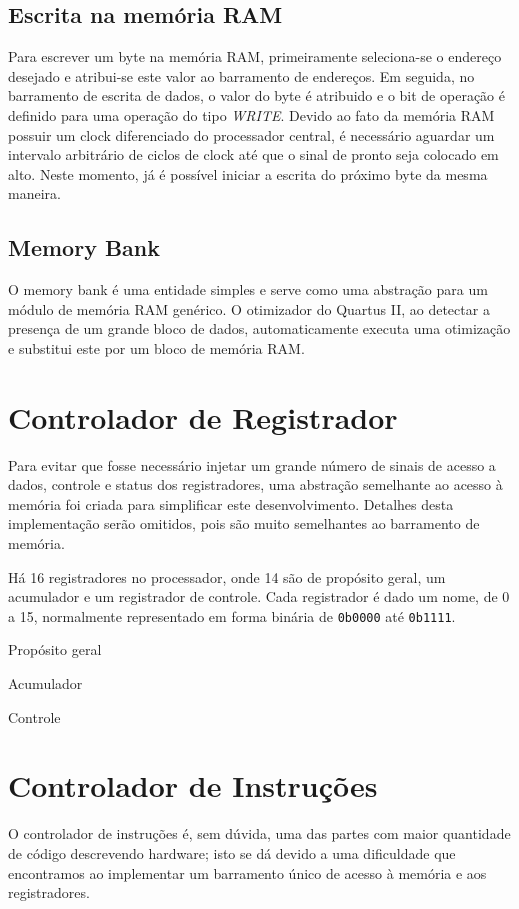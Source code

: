 \documentclass[11pt]{report}
\begin{document}
\subsection{Escrita na memória RAM}
Para escrever um byte na memória RAM, primeiramente seleciona-se o endereço desejado e atribui-se este valor ao barramento de endereços. Em seguida, no barramento de escrita de dados, o valor do byte é atribuido e o bit de operação é definido para uma operação do tipo \emph{WRITE}. Devido ao fato da memória RAM possuir um clock diferenciado do processador central, é necessário aguardar um intervalo arbitrário de ciclos de clock até que o sinal de pronto seja colocado em alto. Neste momento, já é possível iniciar a escrita do próximo byte da mesma maneira.

\subsection{Memory Bank}
\label{sec:MemoryBank}
O memory bank é uma entidade simples e serve como uma abstração para um módulo de memória RAM genérico. O otimizador do Quartus II, ao detectar a presença de um grande bloco de dados, automaticamente executa uma otimização e substitui este por um bloco de memória RAM.

\section{Controlador de Registrador}
Para evitar que fosse necessário injetar um grande número de sinais de acesso a dados, controle e status dos registradores, uma abstração semelhante ao acesso à memória foi criada para simplificar este desenvolvimento. Detalhes desta implementação serão omitidos, pois são muito semelhantes ao barramento de memória.

Há 16 registradores no processador, onde 14 são de propósito geral, um acumulador e um registrador de controle. Cada registrador é dado um nome, de 0 a 15, normalmente representado em forma binária de \texttt{0b0000} até \texttt{0b1111}.

\begin{description}[style=multiline,topsep=10pt,leftmargin=3.2cm]
	\item[0b0000--0b1101] Propósito geral
	\item[0b1110] Acumulador
	\item[0b1111] Controle
\end{description}

\section{Controlador de Instruções}
\label{sec:InstructionController}
O controlador de instruções é, sem dúvida, uma das partes com maior quantidade de código descrevendo hardware; isto se dá devido a uma dificuldade que encontramos ao implementar um barramento único de acesso à memória e aos registradores.
\end{document}
